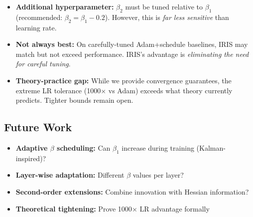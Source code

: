 \begin{itemize}
    \item \textbf{Additional hyperparameter:} $\beta_2$ must be tuned relative to $\beta_1$ (recommended: $\beta_2 = \beta_1 - 0.2$). However, this is \emph{far less sensitive} than learning rate.
    
    \item \textbf{Not always best:} On carefully-tuned Adam+schedule baselines, IRIS may match but not exceed performance. IRIS's advantage is \emph{eliminating the need for careful tuning}.
    
    \item \textbf{Theory-practice gap:} While we provide convergence guarantees, the extreme LR tolerance (1000$\times$ vs Adam) exceeds what theory currently predicts. Tighter bounds remain open.
\end{itemize}

\subsection{Future Work}

\begin{itemize}
    \item \textbf{Adaptive $\beta$ scheduling:} Can $\beta_1$ increase during training (Kalman-inspired)?
    \item \textbf{Layer-wise adaptation:} Different $\beta$ values per layer?
    \item \textbf{Second-order extensions:} Combine innovation with Hessian information?
    \item \textbf{Theoretical tightening:} Prove 1000$\times$ LR advantage formally
\end{itemize}
